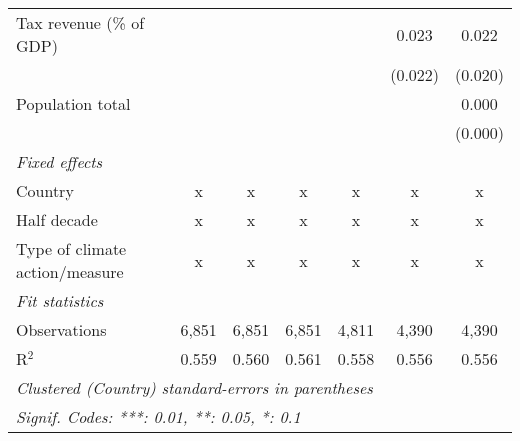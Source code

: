 \begin{tabular}{lcccccc}
   Tax revenue (\% of GDP)                &         &                &                &                & 0.023          & 0.022\\   
                                          &         &                &                &                & (0.022)        & (0.020)\\   
   Population total                       &         &                &                &                &                & 0.000\\   
                                          &         &                &                &                &                & (0.000)\\   
   \emph{Fixed effects}\\
   Country                                & x       & x              & x              & x              & x              & x\\  
   Half decade                            & x       & x              & x              & x              & x              & x\\  
   Type of climate action/measure         & x       & x              & x              & x              & x              & x\\  
   \midrule \emph{Fit statistics}\\
   Observations                           & 6,851   & 6,851          & 6,851          & 4,811          & 4,390          & 4,390\\  
   R$^2$                                  & 0.559   & 0.560          & 0.561          & 0.558          & 0.556          & 0.556\\  
   \midrule
   \multicolumn{7}{l}{\emph{Clustered (Country) standard-errors in parentheses}}\\
   \multicolumn{7}{l}{\emph{Signif. Codes: ***: 0.01, **: 0.05, *: 0.1}}\\
\end{tabular}
\par\endgroup


